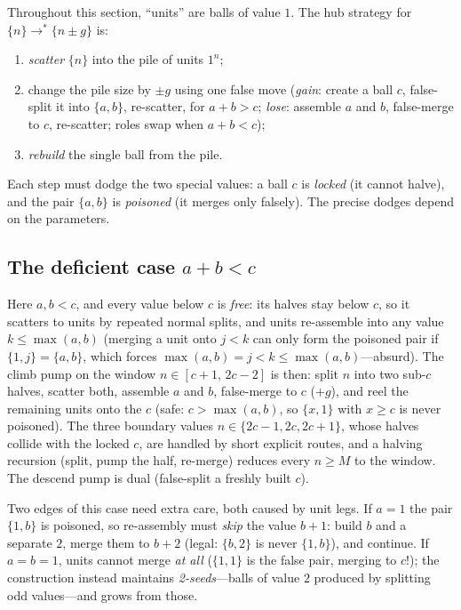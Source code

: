 \documentclass[11pt]{article}
\theoremstyle{definition}
\theoremstyle{remark}
\newcommand{\ms}[1]{\{#1\}}
\newcommand{\reach}{\longrightarrow^{*}}
\begin{document}
Throughout this section, ``units'' are balls of value $1$.  The hub
strategy for $\ms{n}\reach\ms{n\pm g}$ is:
\begin{enumerate}
\item \emph{scatter} $\ms{n}$ into the pile of units $1^{n}$;
\item change the pile size by $\pm g$ using one false move
(\emph{gain}: create a ball $c$, false-split it into $\{a,b\}$, re-scatter,
for $a+b>c$; \emph{lose}: assemble $a$ and $b$, false-merge to $c$,
re-scatter; roles swap when $a+b<c$);
\item \emph{rebuild} the single ball from the pile.
\end{enumerate}
Each step must dodge the two special values: a ball $c$ is \emph{locked}
(it cannot halve), and the pair $\{a,b\}$ is \emph{poisoned} (it merges only
falsely).  The precise dodges depend on the parameters.

\subsection{The deficient case \texorpdfstring{$a+b<c$}{a+b<c}}

Here $a,b<c$, and every value below $c$ is \emph{free}: its halves stay
below $c$, so it scatters to units by repeated normal splits, and units
re-assemble into any value $k\le\max(a,b)$ (merging a unit onto $j<k$
can only form the poisoned pair if $\{1,j\}=\{a,b\}$, which forces
$\max(a,b)=j<k\le \max(a,b)$---absurd).  The climb pump on the window
$n\in[c+1,\,2c-2]$ is then: split $n$ into two sub-$c$ halves, scatter both,
assemble $a$ and $b$, false-merge to $c$ ($+g$), and reel the remaining
units onto the $c$ (safe: $c>\max(a,b)$, so $\{x,1\}$ with $x \geq c$ is
never poisoned).  The three boundary values $n\in\{2c-1,2c,2c+1\}$, whose
halves collide with the locked $c$, are handled by short explicit routes,
and a halving recursion (split, pump the half, re-merge) reduces every
$n\ge M$ to the window.  The descend pump is dual (false-split a freshly
built $c$).

Two edges of this case need extra care, both caused by unit legs.  If
$a=1$ the pair $\{1,b\}$ is poisoned, so re-assembly must \emph{skip} the
value $b+1$: build $b$ and a separate $2$, merge them to $b+2$ (legal:
$\{b,2\}$ is never $\{1,b\}$), and continue.  If $a=b=1$, units cannot merge
\emph{at all} ($\{1,1\}$ is the false pair, merging to $c$!); the
construction instead maintains \emph{2-seeds}---balls of value $2$ produced
by splitting odd values---and grows from those.
\end{document}
